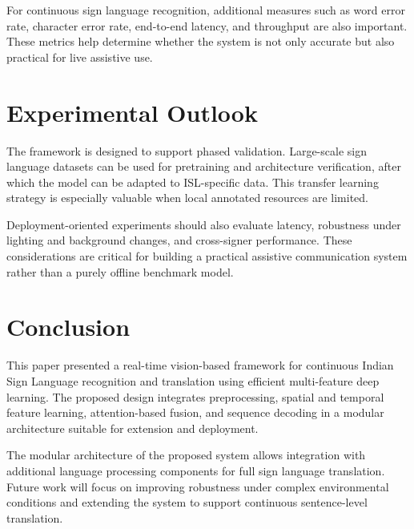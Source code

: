 \documentclass[runningheads]{llncs}
\begin{document}
For continuous sign language recognition, additional measures such as word error rate, character error rate, end-to-end latency, and throughput are also important. These metrics help determine whether the system is not only accurate but also practical for live assistive use.

\section{Experimental Outlook}
The framework is designed to support phased validation. Large-scale sign language datasets can be used for pretraining and architecture verification, after which the model can be adapted to ISL-specific data. This transfer learning strategy is especially valuable when local annotated resources are limited.

Deployment-oriented experiments should also evaluate latency, robustness under lighting and background changes, and cross-signer performance. These considerations are critical for building a practical assistive communication system rather than a purely offline benchmark model.

\section{Conclusion}
This paper presented a real-time vision-based framework for continuous Indian Sign Language recognition and translation using efficient multi-feature deep learning. The proposed design integrates preprocessing, spatial and temporal feature learning, attention-based fusion, and sequence decoding in a modular architecture suitable for extension and deployment.

The modular architecture of the proposed system allows integration with additional language processing components for full sign language translation. Future work will focus on improving robustness under complex environmental conditions and extending the system to support continuous sentence-level translation.
\end{document}
